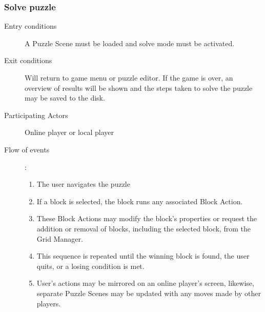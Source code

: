 \documentclass[12pt]{article}
\begin{document}
    \subsubsection{Solve puzzle}
    \begin{description}
        \item[Entry conditions] A Puzzle Scene must be loaded and solve mode
            must be activated.
        \item[Exit conditions] Will return to game menu or puzzle editor.
            If the game is over, an overview of results will be shown and the
            steps taken to solve the puzzle may be saved to the disk.
        \item[Participating Actors] Online player or local player
        \item[Flow of events]:
            \begin{enumerate}
                \item The user navigates the puzzle
                \item If a block is selected, the block runs any associated
                    Block Action.
                \item These Block Actions may modify the block's properties or
                    request the addition or removal of blocks, including the
                    selected block, from the Grid Manager.
                \item This sequence is repeated until the winning block is
                    found, the user quits, or a losing condition is met.
                \item User's actions may be mirrored on an online player's
                    screen, likewise, separate Puzzle Scenes  may be updated
                    with any moves made by other players.
            \end{enumerate}
    \end{description}


\end{document}
